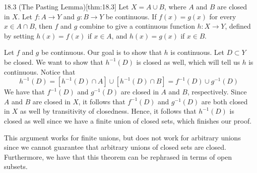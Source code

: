 \begin{thmBox}{18.3 (The Pasting Lemma)}[thm:18.3]
    Let \( X = A \cup B \), where \( A \) and \( B \) are closed in \( X \).
    Let \( f: A \rightarrow Y \) and \( g: B \rightarrow Y \) be continuous.
    If \( f ( x ) = g ( x ) \) for every \( x \in A \cap B \), then \( f \)
    and \( g \) combine to give a continuous function \( h: X \rightarrow Y \),
    defined by setting \( h ( x ) = f ( x ) \) if \( x \in A \), and 
    \( h ( x ) = g ( x ) \) if \( x \in B \).

    \baseRule

    \begin{proofBox}
        Let \( f \) and \( g \) be continuous.
        Our goal is to show that \( h \) is continuous.
        Let \( D \subset Y \) be closed.
        We want to show that \( h^{ -1 } ( D ) \) is closed as well, which 
        will tell us \( h \) is continuous.
        Notice that 
        \begin{equation*}
            h^{ -1 } ( D )
            =
            [ h^{ -1 } ( D ) \cap A ] \cup [ h^{ -1 } ( D ) \cap B ]
            =
            f^{ -1 } ( D ) \cup g^{ -1 } ( D ) 
        \end{equation*}
        We have that \( f^{ -1 } ( D ) \) and \( g^{ -1 } ( D ) \) are closed in
        \( A \) and \( B \), respectively.
        Since \( A \) and \( B \) are closed in \( X \), it follows that 
        \( f^{ -1 } ( D ) \) and \( g^{ -1 } ( D ) \) are both closed in \( X \)
        as well by transitivity of closedness.
        Hence, it follows that \( h^{ -1 } ( D ) \) is closed as well since 
        we have a finite union of closed sets, which finishes our proof.

        \baseSkip

        This argument works for finite unions, but does not work for arbitrary unions since we cannot guarantee that arbitrary unions of closed sets 
        are closed.
        Furthermore, we have that this theorem can be rephrased in terms of open
        subsets.
    \end{proofBox}
\end{thmBox}

